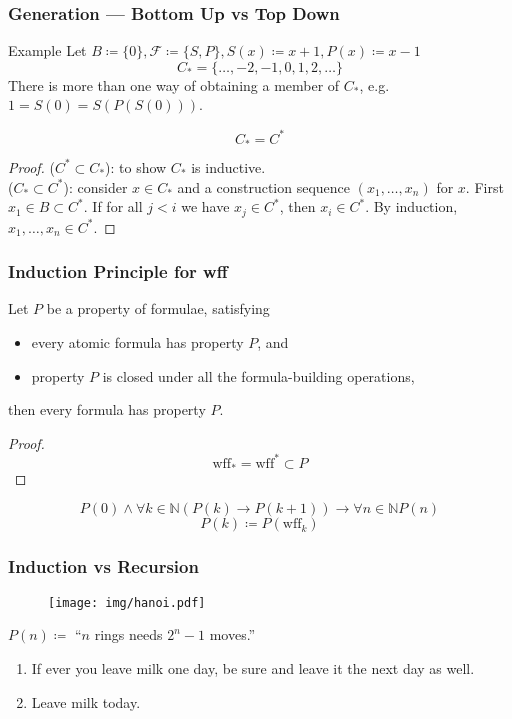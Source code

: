 \documentclass[UTF8,11pt,colorlinks,compress,openany]{beamer}%
\begin{document}
\begin{frame}\frametitle{Generation --- Bottom Up vs Top Down}
\setlength\abovedisplayskip{0pt}
\setlength\belowdisplayskip{0pt}
\begin{block}{Example}
		Let $B\coloneqq \{0\}, \mathcal{F}\coloneqq \{S,P\}, S(x)\coloneqq x+1, P(x)\coloneqq x-1$
		\[C_*=\{\dots,-2,-1,0,1,2,\dots\}\]
		There is more than one way of obtaining a member of $C_*$, e.g. $1=S(0)=S(P(S(0)))$.
\end{block}
\begin{theorem}
	\[C_*=C^*\]
\end{theorem}
\begin{proof}
	($C^*\subset C_*$): to show $C_*$ is inductive.\\
	($C_*\subset C^*$): consider $x\in C_*$ and a construction sequence $(x_1,\dots,x_n)$ for $x$. First $x_1\in B\subset C^*$. If for all $j<i$ we have $x_j\in C^*$, then $x_i\in C^*$. By induction, $x_1,\dots,x_n\in C^*$.
\end{proof}
\end{frame}

\begin{frame}\frametitle{Induction Principle for wff}
	\begin{theorem}
		Let $P$ be a property of formulae, satisfying
		\begin{itemize}
		\item every atomic formula has property $P$, and
		\item property $P$ is closed under all the formula-building operations,
		\end{itemize}
		then every formula has property $P$.
	\end{theorem}
	\begin{proof}
		\[\mathrm{wff}_*=\mathrm{wff}^*\subset P\]
	\end{proof}
	\[P(0)\wedge\forall k\in\mathbb{N}(P(k)\to P(k+1))\to\forall n\in\mathbb{N} P(n)\]
	\[P(k)\coloneqq P(\mathrm{wff}_k)\]
\end{frame}

\begin{frame}\frametitle{Induction vs Recursion}
\begin{figure}[H]
\texttt{[image: img/hanoi.pdf]}
\end{figure}
\begin{center}
$P(n)\coloneqq $ ``$n$ rings needs $2^n-1$ moves.''
\end{center}
\begin{block}{}
\begin{enumerate}
\item If ever you leave milk one day, be sure and leave it the next day as well.
\item Leave milk today.
\end{enumerate}
\end{block}
\centering
{}
\end{frame}
\end{document}
